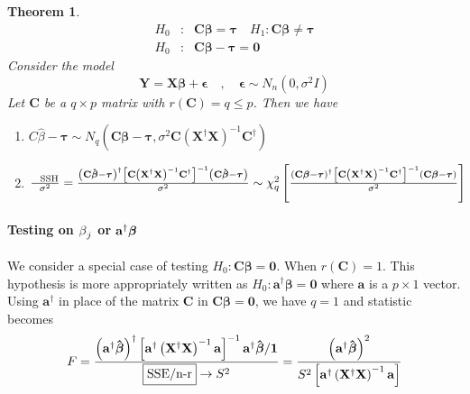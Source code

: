 \documentclass{article}
\newtheorem{theorem}{Theorem}
\begin{document}
\begin{theorem}
\begin{eqnarray*}
H_{0} &:&\mathbf{C\beta =\tau }\quad H_{1}:\mathbf{C\beta \neq \tau } \\
H_{0} &:&\mathbf{C\beta -\tau =0}
\end{eqnarray*}%
\newline
Consider the model%
\begin{equation*}
\mathbf{Y=X\beta +\epsilon \quad ,\quad \epsilon }\sim N_{n}\left( 0,\sigma
^{2}I\right)
\end{equation*}%
\newline
Let $\mathbf{C}$ be a $q\times p$ matrix with $r\left( \mathbf{C}\right)
=q\leq p$. Then we have

\begin{enumerate}
\item $C\hat{\beta}-\mathbf{\tau }\sim N_{q}\left( \mathbf{C\beta -\tau }%
,\sigma ^{2}\mathbf{C}\left( \mathbf{X}^{\dagger }\mathbf{X}\right) ^{-1}%
\mathbf{C}^{\dagger }\right) $

\item $\frac{\text{SSH}}{\sigma ^{2}}=\frac{\left( \mathbf{C\hat{\beta}-\tau 
}\right) ^{\dagger }\left[ \mathbf{C}\left( \mathbf{X}^{\dagger }\mathbf{X}%
\right) ^{-1}\mathbf{C}^{\dagger }\right] ^{-1}\left( \mathbf{C\hat{\beta}%
-\tau }\right) }{\sigma ^{2}}\sim \chi _{q}^{2}\left[ \frac{\left( \mathbf{%
C\beta -\tau }\right) ^{\dagger }\left[ \mathbf{C}\left( \mathbf{X}^{\dagger
}\mathbf{X}\right) ^{-1}\mathbf{C}^{\dagger }\right] ^{-1}\left( \mathbf{%
C\beta -\tau }\right) }{\sigma ^{2}}\right] $
\end{enumerate}
\end{theorem}

\bigskip

\paragraph{Testing on $\protect\beta _{j}$ or $\mathbf{a}^{\dagger }\mathbf{%
\protect\beta }$}

We consider a special case of testing $H_{0}:\mathbf{C\beta =0}$. When $%
r\left( \mathbf{C}\right) =1$. This hypothesis is more appropriately written
as $H_{0}:\mathbf{a}^{\dagger }\mathbf{\beta =0}$ where $\mathbf{a}$ is a $%
p\times 1$ vector. Using $\mathbf{a}^{\dagger }$ in place of the matrix $%
\mathbf{C}$ in $\mathbf{C\beta =0}$,\newline
we have $q=1$ and statistic becomes%
\begin{equation*}
F=\frac{\left( \mathbf{a}^{\dagger }\mathbf{\hat{\beta}}\right) ^{\dagger }%
\left[ \mathbf{a}^{\dagger }\left( \mathbf{X}^{\dagger }\mathbf{X}\right)
^{-1}\mathbf{a}\right] ^{-1}\mathbf{a}^{\dagger }\mathbf{\hat{\beta}/1}}{%
\fbox{SSE/n-r}\rightarrow S^{2}}=\frac{\left( \mathbf{a}^{\dagger }\mathbf{%
\hat{\beta}}\right) ^{2}}{S^{2}\left[ \mathbf{a}^{\dagger }\left( \mathbf{X}%
^{\dagger }\mathbf{X}\right) ^{-1}\mathbf{a}\right] }
\end{equation*}
\end{document}
